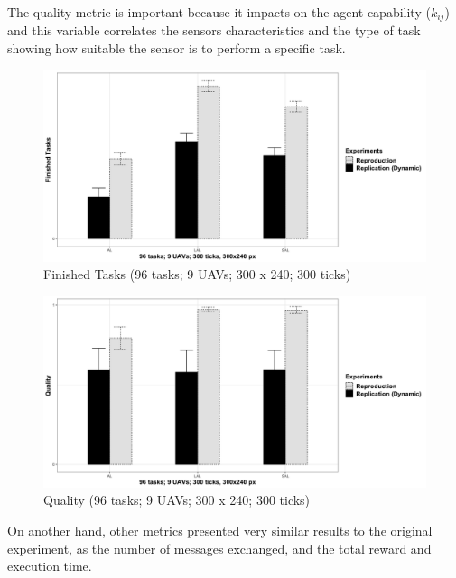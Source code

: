 The quality metric is important because it impacts on the agent capability ($k_{ij}$) and this variable correlates the sensors characteristics and the type of task showing how suitable the sensor is to perform a specific task. 

\begin{figure}[h!]
	\begin{center}
		\includegraphics[scale=0.15]{fig/GRAPH01.png}
		\caption{Finished Tasks (96 tasks; 9 UAVs; 300 x 240; 300 ticks)}
		\label{fig:fig04}
	\end{center}
\end{figure}

\begin{figure}[h!]
	\begin{center}
		\includegraphics[scale=0.15]{fig/GRAPH02.png}
		\caption{Quality (96 tasks; 9 UAVs; 300 x 240; 300 ticks)}
		\label{fig:fig03}
	\end{center}
\end{figure}

On another hand, other metrics presented very similar results to the original experiment, as the number of messages exchanged, and the total reward and execution time.

